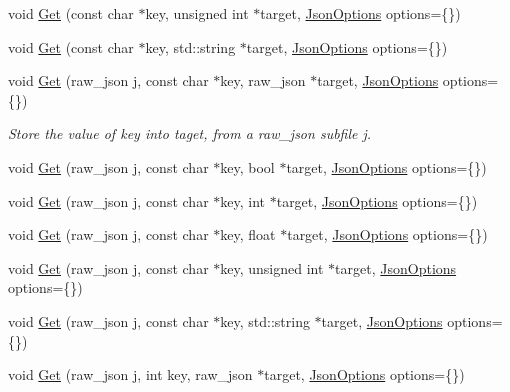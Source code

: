 \begin{DoxyCompactItemize}
\item 
void \hyperlink{classTarbora_1_1Json_ac4c8151ef4bd84a31bcdd776f9307965}{Get} (const char $\ast$key, unsigned int $\ast$target, \hyperlink{structTarbora_1_1JsonOptions}{Json\+Options} options=\{\})
\item 
void \hyperlink{classTarbora_1_1Json_a5c9177d86857f6f80b5a5eac9adde4d2}{Get} (const char $\ast$key, std\+::string $\ast$target, \hyperlink{structTarbora_1_1JsonOptions}{Json\+Options} options=\{\})
\item 
void \hyperlink{classTarbora_1_1Json_acf1db08b245d7f9b40576b412194b287}{Get} (raw\+\_\+json j, const char $\ast$key, raw\+\_\+json $\ast$target, \hyperlink{structTarbora_1_1JsonOptions}{Json\+Options} options=\{\})
\begin{DoxyCompactList}\small\item\em Store the value of {\itshape key} into {\itshape taget}, from a raw\+\_\+json subfile {\itshape j}. \end{DoxyCompactList}\item 
void \hyperlink{classTarbora_1_1Json_a488bdf866cc1df65b964752543f6c04c}{Get} (raw\+\_\+json j, const char $\ast$key, bool $\ast$target, \hyperlink{structTarbora_1_1JsonOptions}{Json\+Options} options=\{\})
\item 
void \hyperlink{classTarbora_1_1Json_ae9c3713f12b22742e82699da53dc34d9}{Get} (raw\+\_\+json j, const char $\ast$key, int $\ast$target, \hyperlink{structTarbora_1_1JsonOptions}{Json\+Options} options=\{\})
\item 
void \hyperlink{classTarbora_1_1Json_aa5b6c3dbf5e587e9bf4bfd6880b14f16}{Get} (raw\+\_\+json j, const char $\ast$key, float $\ast$target, \hyperlink{structTarbora_1_1JsonOptions}{Json\+Options} options=\{\})
\item 
void \hyperlink{classTarbora_1_1Json_a5cb7ad199c7f33a82f8602e74ea246eb}{Get} (raw\+\_\+json j, const char $\ast$key, unsigned int $\ast$target, \hyperlink{structTarbora_1_1JsonOptions}{Json\+Options} options=\{\})
\item 
void \hyperlink{classTarbora_1_1Json_a9a8713a7b0fec22135c38ed52d8018bd}{Get} (raw\+\_\+json j, const char $\ast$key, std\+::string $\ast$target, \hyperlink{structTarbora_1_1JsonOptions}{Json\+Options} options=\{\})
\item 
void \hyperlink{classTarbora_1_1Json_a0f7f0bb14cb1f52afab3c9e44b5b46fc}{Get} (raw\+\_\+json j, int key, raw\+\_\+json $\ast$target, \hyperlink{structTarbora_1_1JsonOptions}{Json\+Options} options=\{\})
\item 

\end{DoxyCompactItemize}
